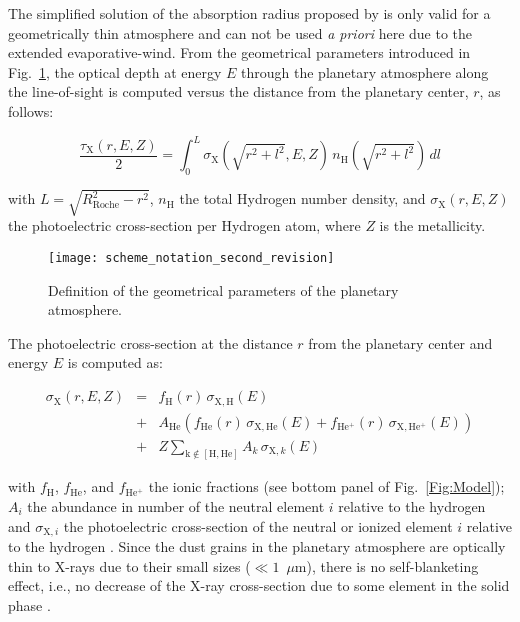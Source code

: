 \documentclass[iop]{emulateapj}
\begin{document}
The simplified solution of the absorption radius proposed by \cite{Fortney2005} is only valid for a geometrically thin atmosphere and can not 
be used {\it a priori} here due to the extended evaporative-wind. From the geometrical parameters introduced in Fig.~\ref{Fig:notations},
the optical depth at energy $E$ through the planetary atmosphere along the line-of-sight is computed versus the distance from the planetary 
center, $r$, as follows:

\begin{equation}
\frac{\tau{_\mathrm{X}(r,E,Z)}}{2}=
\!\!\int_0^L \!\!\!\sigma_\mathrm{X}(\sqrt{r^2+l^2},E,Z) \, n_\mathrm{H}(\sqrt{r^2+l^2})\,dl
\label{tau}
\end{equation}    

with $L=\sqrt{R_\mathrm{Roche}^2-r^2}$, $n_\mathrm{H}$ the total Hydrogen number density, and $\sigma_\mathrm{X}(r,E,Z)$
the photoelectric cross-section per Hydrogen atom, where $Z$ is the metallicity.

\begin{figure}[!t]
  \centering
  \texttt{[image: scheme\_notation\_second\_revision]} 
  \caption{Definition of the geometrical parameters of the 
  planetary atmosphere.}
  \label{Fig:notations} 
\end{figure}

The photoelectric cross-section at the distance $r$ from the planetary center and energy $E$ is computed as:

\begin{eqnarray}
\sigma_\mathrm{X}(r,E,Z)&=&f_\mathrm{H}(r)\,\sigma_{\mathrm{X,H}}(E)\nonumber\\
			&+&  A_\mathrm{He}\left(f_\mathrm{He}(r)\,\sigma_{\mathrm{X,He}}(E)+f_\mathrm{He^+}(r)\,\sigma_{\mathrm{X,He^+}}(E)\right)\nonumber\\
			&+&Z \sum_\mathrm{k \notin [H,He]} \!\!A_k\,\sigma_{\mathrm{X,}k}(E)
\label{Eq:depth}
\end{eqnarray}


with $f_\mathrm{H}$, $f_\mathrm{He}$, and $f_\mathrm{He^+}$ the ionic fractions (see bottom panel of Fig.~\ref{Fig:Model});
$A_i$ the abundance in number of the neutral element $i$ relative to the hydrogen \citep{Asplund2009} and $\sigma_{\mathrm{X,}i}$ 
the photoelectric cross-section of the neutral or ionized element $i$ relative to the hydrogen \citep{Verner1995}. Since 
the dust grains in the planetary atmosphere are optically thin to X-rays due to their small sizes ($\ll1$~$\mu$m), there is no 
self-blanketing effect, i.e., no decrease of the X-ray cross-section due to some element in the solid phase \citep{Bethell2011}. 
\end{document}
